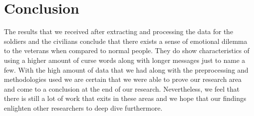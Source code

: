 \section{Conclusion}

The results that we received after extracting and processing the data for the soldiers and the civilians conclude that there exists a sense of emotional dilemma to the veterans when compared to normal people. They do show characteristics of using a higher amount of curse words along with longer messages just to name a few. With the high amount of data that we had along with the preprocessing and methodologies used we are certain that we were able to prove our research area and come to a conclusion at the end of our research. Nevertheless, we feel that there is still a lot of work that exits in these areas and we hope that our findings enlighten other researchers to deep dive furthermore.
